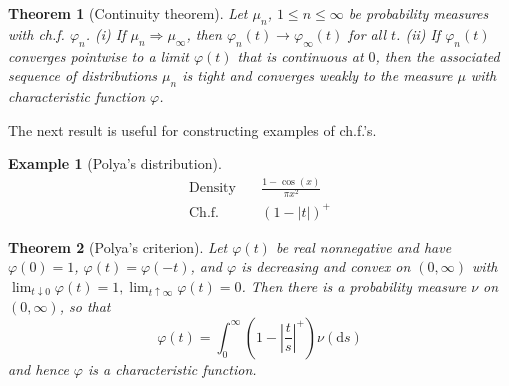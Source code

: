 \documentclass{article}
\newtheorem{Thm}{Theorem}[section]
\newtheorem{Eg}{Example}[section]
\theoremstyle{definition}
\begin{document}
\begin{Thm}[Continuity theorem]
    Let $\mu_n$, $1\le n\le \infty$ be probability measures with ch.f. $\varphi_n$.\newline 
    (i) If $\mu_n\Longrightarrow \mu_\infty$, then $\varphi_n(t)\to\varphi_\infty(t)$ for all $t$.\newline 
    (ii) If $\varphi_n(t)$ converges pointwise to a limit $\varphi(t)$ that is continuous at $0$,
    then the associated sequence of distributions $\mu_n$ is tight and converges weakly to the measure $\mu$ with characteristic function $\varphi$.
\end{Thm}

The next result is useful for constructing examples of ch.f.'s.
\begin{Eg}[Polya's distribution]
    \begin{align*}
        \text{Density}\quad& \frac{1-\cos(x)}{\pi x^2}   \\
        \text{Ch.f.}\quad& (1-\left|t\right|)^+
    \end{align*}

\end{Eg}
\begin{Thm}[Polya's criterion]
    Let $\varphi(t)$ be real nonnegative and have $\varphi(0)=1$, $\varphi(t)=\varphi(-t)$, and $\varphi$ is decreasing and convex on $(0,\infty)$ with 
    $\lim_{t\downarrow 0}\varphi(t)=1,\lim_{t\uparrow\infty}\varphi(t)=0$. Then there is a probability measure $\nu$ on $(0,\infty)$, so that
    \[\varphi(t)=\int_0^\infty (1-\left|\frac{t}{s}\right|^+)\nu(\mathrm{d}s)\] 
    and hence $\varphi$ is a characteristic function.
\end{Thm}
\end{document}
